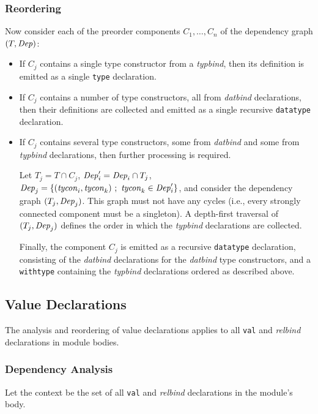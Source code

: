 \subsubsection{Reordering}
Now consider each of the preorder components $C_1,\ldots,C_n$ of the
dependency graph $(T,\mbox{\textit{Dep}})$:
\begin{itemize}
\item If $C_j$ contains a single type constructor from a \emph{typbind},
then its definition is emitted as a single \texttt{type} declaration.
\item If $C_j$ contains a number of type constructors, all
from \emph{datbind} declarations, then their definitions are
collected and emitted as a single recursive \texttt{datatype} declaration.
\item If $C_j$ contains several type constructors, some from \emph{datbind}
and some from \emph{typbind} declarations, then further processing
is required.

Let $T_j = T\cap C_j$, $\mbox{\textit{Dep}}'_i = \mbox{\textit{Dep}}_i\cap T_j$,
$\mbox{\textit{Dep}}_j = \{(\mbox{\textit{tycon}}_i,\mbox{\textit{tycon}}_k) ~;~ \mbox{\textit{tycon}}_k\in\mbox{\textit{Dep}}'_i\}$,
and consider the dependency graph $(T_j,\mbox{\textit{Dep}}_j)$.
This graph  must not have any cycles (i.e.,
every strongly connected component must be a singleton).
A depth-first traversal of $(T_j,\mbox{\textit{Dep}}_j)$ defines the order in which
the \emph{typbind} declarations are collected.

Finally, the component $C_j$ is emitted as a recursive \texttt{datatype}
declaration, consisting of the \emph{datbind} declarations for the
\emph{datbind} type constructors, and a \texttt{withtype} containing
the \emph{typbind} declarations ordered as described above.
\end{itemize}

\subsection{Value Declarations}
The analysis and reordering of value declarations applies to
all \texttt{val} and \emph{relbind} declarations in module bodies.

\subsubsection{Dependency Analysis}
Let the context be the set of all \texttt{val} and \emph{relbind}
declarations in the module's body.

